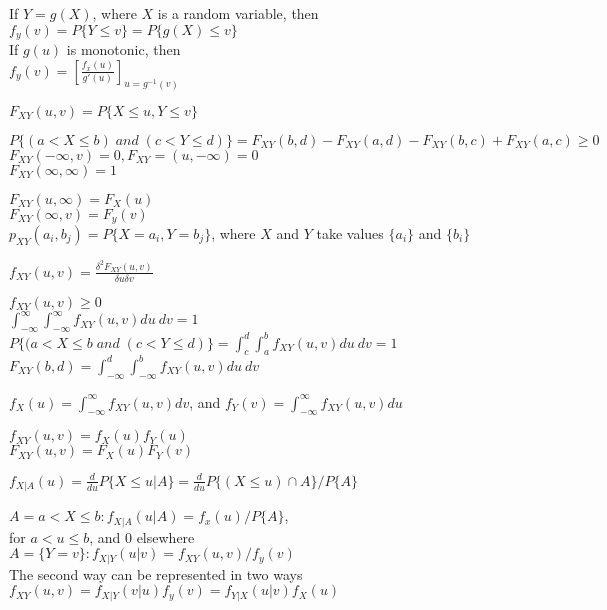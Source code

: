 
If $Y=g(X)$, where $X$ is a random variable, then \\
$f_y(v)=P\{Y\leq v\}=P\{g(X)\leq v\}$ \\
If $g(u)$ is monotonic, then \\
$f_y(v)=[\frac{f_x(u)}{g'(u)}]_{u=g^{-1}(v)}$


$F_{XY}(u,v)=P\{X\leq u, Y\leq v\}$

$P\{(a<X\leq b) \; and \; (c<Y\leq d)\}=F_{XY}(b,d)-F_{XY}(a,d)-F_{XY}(b,c)+F_{XY}(a,c)\geq 0$ \\
$F_{XY}(-\infty,v)=0, F_{XY}=(u,-\infty)=0$ \\
$F_{XY}(\infty, \infty)=1$

$F_{XY}(u, \infty)=F_X(u)$ \\
$F_{XY}(\infty, v)=F_y(v)$ \\

$p_{XY}(a_i, b_j)=P\{X=a_i, Y=b_j\}$, where $X$ and $Y$ take values $\{a_i\}$ and $\{b_i\}$

$f_{XY}(u,v)=\frac{\delta^2F_{XY}(u,v)}{\delta u \delta v}$

$f_{XY}(u,v) \geq 0$ \\
$\int_{-\infty}^{\infty}\int_{-\infty}^{\infty}f_{XY}(u,v)du\: dv = 1$ \\
$P\{(a<X\leq b \; and \;(c<Y\leq d)\} = \int_{c}^{d}\int_{a}^{b}f_{XY}(u,v)du\: dv = 1$ \\
$F_{XY}(b,d)=\int_{-\infty}^{d}\int_{-\infty}^{b}f_{XY}(u,v)du\: dv$

$f_X(u)=\int_{-\infty}^{\infty}f_{XY}(u,v)dv$, and $f_Y(v)=\int_{-\infty}^{\infty}f_{XY}(u,v)du$

$f_{XY}(u,v) = f_X(u)f_Y(u)$ \\
$F_{XY}(u,v)=F_X(u)F_Y(v)$

$f_{X|A}(u)=\frac{d}{du}P\{X\leq u|A\}=\frac{d}{du}P\{(X\leq u) \cap A\}/P\{A\} $

$A={a<X\leq b}:f_{X|A}(u|A)=f_x(u)/P\{A\}$, \\ for $a<u\leq b$, and $0$ elsewhere \\
$A=\{Y=v\}:f_{X|Y}(u|v)=f_{XY}(u,v)/f_y(v)$ \\
The second way can be represented in two ways \\
$f_{XY}(u,v)=f_{X|Y}(v|u)f_y(v)=f_{Y|X}(u|v)f_X(u)$

